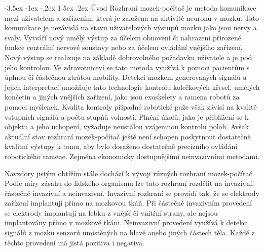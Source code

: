 \documentclass[a4paper,10pt]{article}
\makeatletter
\theoremstyle{definition}
\renewcommand\section{\@startsection {section}{1}{\z@}%
                                   {-3.5ex \@plus -1ex \@minus -.2ex}%
                                   {1.5ex \@plus.2ex}%
                                   {\large\bfseries}}
\makeatother
\begin{document}
\section{Úvod}
\label{sec:1}
Rozhraní mozek-počítač je metoda komunikace mezi uživatelem a zařízením, která je založena na aktivitě neuronů v mozku. Tato komunikace je nezávislá na stavu uživatelových výstupů mozku jako jsou nervy a svaly. Vytváří nový umělý výstup za účelem obnovení či nahrazení přirozené funkce centrální nervové soustavy nebo za účelem ovládání vnějšího zařízení. Nový výstup se realizuje na základě dobrovolného požadavku uživatele a je pod jeho kontrolou. Ve zdravotnictví se tato metoda využívá k pomoci pacientům s úplnou či částečnou ztrátou mobility. Detekcí mozkem generovaných signálů a jejich interpretací umožňuje tato technologie kontrolu kolečkových křesel, umělých končetin a jiných vnějších zařízení, jako jsou exoskelety a ramena robotů za pomoci myšlenek. Kvalita kontroly případné robotické paže však závisí na kvalitě vstupních signálů a počtu stupňů volnosti. Plnění úkolů, jako je přiblížení se k objektu a jeho uchopení, vyžaduje neustálou vzájemnou kontrolu poloh. Avšak aktuální stav rozhraní mozek-počítač ještě není schopen poskytnout dostatečně kvalitní výstupy k tomu, aby bylo dosaženo dostatečně precizního ovládání robotického ramene. Zejména ekonomicky dostupnějšími neinvazivními metodami.

Navzdory jistým obtížím stále dochází k vývoji různých rozhraní mozek-počítač. Podle míry zásahu do lidského organismu lze tato rozhraní rozdělit na invazivní, částečně invazivní a neinvazivní. Invazivní rozhraní se provádí tak, že se elektrody zařízení implantují přímo na mozkovou tkáň. Při částečně invazivním provedení se elektrody implantují na lebku z vnější či vnitřní strany, ale nejsou implantovány přímo v mozkové tkáni. Neinvazivní provedení využívá k detekci signálů z mozku senzorů umístěných na hlavě anebo jiných částech těla. Každé z těchto provedení má jistá pozitiva i negativa.\cite{AI2023obrazovky, article, athanasiou2017rehabilitation, handshake, article3, inbook2, s23136001obrazekmozkusesenzory, s22135000, article4, article2, inbook, zhou2023shared}
\end{document}

